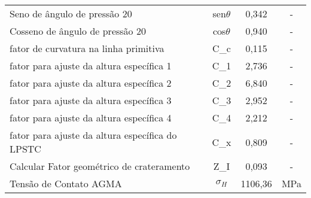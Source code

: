 \begin{table}[]
\begin{tabular}{l c c c}
Seno de ângulo de pressão 20                                                                                                 & sen$\theta$           & 0,342          & -             \\
Cosseno de ângulo de pressão 20                                                                                              & cos$\theta$           & 0,940          & -             \\
fator de curvatura na linha primitiva                                                                                        & C_c             & 0,115          & -             \\
fator para ajuste da altura específica 1                                                                                     & C_1             & 2,736          & -             \\
fator para ajuste da altura específica 2                                                                                     & C_2             & 6,840          & -             \\
fator para ajuste da altura específica 3                                                                                     & C_3             & 2,952          & -             \\
fator para ajuste da altura específica 4                                                                                     & C_4             & 2,212          & -             \\
fator para ajuste da altura específica do LPSTC                                                                              & C_x             & 0,809          & -             \\
Calcular Fator geométrico de crateramento                                                                                    & Z_I             & 0,093          & -             \\
Tensão de Contato AGMA                                                                                                       & $\sigma_H$              & 1106,36        & MPa             \\ \hline  
\end{tabular}
\end{table}